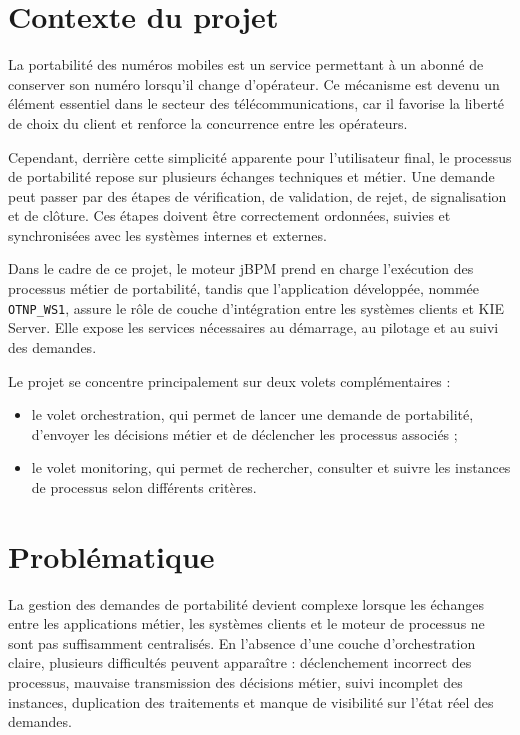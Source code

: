 \documentclass[12pt,a4paper]{report}
\begin{document}
\section{Contexte du projet}
La portabilité des numéros mobiles est un service permettant à un abonné de conserver son numéro lorsqu'il change d'opérateur. Ce mécanisme est devenu un élément essentiel dans le secteur des télécommunications, car il favorise la liberté de choix du client et renforce la concurrence entre les opérateurs.

Cependant, derrière cette simplicité apparente pour l'utilisateur final, le processus de portabilité repose sur plusieurs échanges techniques et métier. Une demande peut passer par des étapes de vérification, de validation, de rejet, de signalisation et de clôture. Ces étapes doivent être correctement ordonnées, suivies et synchronisées avec les systèmes internes et externes.

Dans le cadre de ce projet, le moteur jBPM prend en charge l'exécution des processus métier de portabilité, tandis que l'application développée, nommée \texttt{OTNP\_WS1}, assure le rôle de couche d'intégration entre les systèmes clients et KIE Server. Elle expose les services nécessaires au démarrage, au pilotage et au suivi des demandes.

Le projet se concentre principalement sur deux volets complémentaires :
\begin{itemize}
    \item le volet orchestration, qui permet de lancer une demande de portabilité, d'envoyer les décisions métier et de déclencher les processus associés ;
    \item le volet monitoring, qui permet de rechercher, consulter et suivre les instances de processus selon différents critères.
\end{itemize}

\section{Problématique}
La gestion des demandes de portabilité devient complexe lorsque les échanges entre les applications métier, les systèmes clients et le moteur de processus ne sont pas suffisamment centralisés. En l'absence d'une couche d'orchestration claire, plusieurs difficultés peuvent apparaître : déclenchement incorrect des processus, mauvaise transmission des décisions métier, suivi incomplet des instances, duplication des traitements et manque de visibilité sur l'état réel des demandes.
\end{document}
